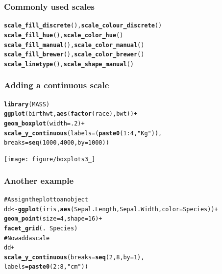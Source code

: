 \documentclass{beamer}\usepackage{graphicx, color}
\makeatletter
\newcommand{\hlfunctioncall}[1]{\textcolor[rgb]{0.501960784313725,0,0.329411764705882}{\textbf{#1}}}%
\newcommand{\hlstring}[1]{\textcolor[rgb]{0.6,0.6,1}{#1}}%
\newcommand{\hlcomment}[1]{\textcolor[rgb]{0.180392156862745,0.6,0.341176470588235}{#1}}%
\newenvironment{kframe}{%
 \def\at@end@of@kframe{}%
 \ifinner\ifhmode%
  \def\at@end@of@kframe{\end{minipage}}%
  \begin{minipage}{\columnwidth}%
 \fi\fi%
 \def\FrameCommand##1{\hskip\@totalleftmargin \hskip-\fboxsep
 \colorbox{shadecolor}{##1}\hskip-\fboxsep
     \hskip-\linewidth \hskip-\@totalleftmargin \hskip\columnwidth}%
 \MakeFramed {\advance\hsize-\width
   \@totalleftmargin\z@ \linewidth\hsize
   \@setminipage}}%
 {\par\unskip\endMakeFramed%
 \at@end@of@kframe}
\newenvironment{knitrout}{}{} %
\makeatother
\begin{document}
\begin{frame}[fragile]
\frametitle{Commonly used scales}
\begin{knitrout}\footnotesize
{}\color{fgcolor}\begin{kframe}
\begin{alltt}
\hlfunctioncall{scale_fill_discrete}(), \hlfunctioncall{scale_colour_discrete}()
\hlfunctioncall{scale_fill_hue}(), \hlfunctioncall{scale_color_hue}()
\hlfunctioncall{scale_fill_manual}(),  \hlfunctioncall{scale_color_manual}()
\hlfunctioncall{scale_fill_brewer}(), \hlfunctioncall{scale_color_brewer}()
\hlfunctioncall{scale_linetype}(), \hlfunctioncall{scale_shape_manual}()
\end{alltt}
\end{kframe}
\end{knitrout}

\end{frame}

\begin{frame}[fragile]
\frametitle{Adding a continuous scale}
\begin{knitrout}\footnotesize
{}\color{fgcolor}\begin{kframe}
\begin{alltt}
\hlfunctioncall{library}(MASS)
\hlfunctioncall{ggplot}(birthwt, \hlfunctioncall{aes}(\hlfunctioncall{factor}(race), bwt)) +
\hlfunctioncall{geom_boxplot}(width = .2) +
\hlfunctioncall{scale_y_continuous}(labels = (\hlfunctioncall{paste0}(1:4, \hlstring{" Kg"})),
breaks = \hlfunctioncall{seq}(1000, 4000, by = 1000))
\end{alltt}
\end{kframe}
\texttt{[image: figure/boxplots3\_]} 

\end{knitrout}

\end{frame}


\begin{frame}[fragile]
\frametitle{Another example}
\begin{knitrout}\footnotesize
{}\color{fgcolor}\begin{kframe}
\begin{alltt}
\hlcomment{# Assign the plot to an object}
dd <- \hlfunctioncall{ggplot}(iris, \hlfunctioncall{aes}(Sepal.Length, Sepal.Width, color = Species)) +
\hlfunctioncall{geom_point}(size = 4, shape = 16) +
\hlfunctioncall{facet_grid}(. ~Species)
\hlcomment{# Now add a scale}
dd +
\hlfunctioncall{scale_y_continuous}(breaks = \hlfunctioncall{seq}(2, 8, by = 1),
labels = \hlfunctioncall{paste0}(2:8, \hlstring{" cm"}))
\end{alltt}
\end{kframe}
\end{knitrout}

\end{frame}
\end{document}
